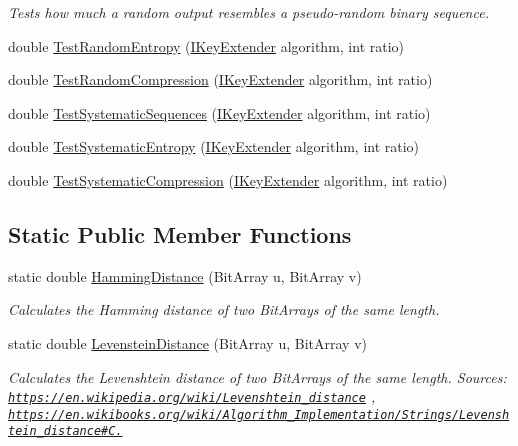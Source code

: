 \begin{DoxyCompactItemize}
\begin{DoxyCompactList}\small\item\em Tests how much a random output resembles a pseudo-\/random binary sequence. \end{DoxyCompactList}\item 
double \hyperlink{class_crypto_1_1_function_testing_a9a647990f55860fb5c1703e4734a78e3}{Test\+Random\+Entropy} (\hyperlink{interface_crypto_1_1_i_key_extender}{I\+Key\+Extender} algorithm, int ratio)
\item 
double \hyperlink{class_crypto_1_1_function_testing_a29540726fa140a1cf1d2b637af553233}{Test\+Random\+Compression} (\hyperlink{interface_crypto_1_1_i_key_extender}{I\+Key\+Extender} algorithm, int ratio)
\item 
double \hyperlink{class_crypto_1_1_function_testing_a082771a8c25d3ac4b29906cbd73fb584}{Test\+Systematic\+Sequences} (\hyperlink{interface_crypto_1_1_i_key_extender}{I\+Key\+Extender} algorithm, int ratio)
\item 
double \hyperlink{class_crypto_1_1_function_testing_a38ff139e200ca760a150fd23f9b8c754}{Test\+Systematic\+Entropy} (\hyperlink{interface_crypto_1_1_i_key_extender}{I\+Key\+Extender} algorithm, int ratio)
\item 
double \hyperlink{class_crypto_1_1_function_testing_a3e1bedf80b820d257984dbae03d0e0e1}{Test\+Systematic\+Compression} (\hyperlink{interface_crypto_1_1_i_key_extender}{I\+Key\+Extender} algorithm, int ratio)
\end{DoxyCompactItemize}
\subsection*{Static Public Member Functions}
\begin{DoxyCompactItemize}
\item 
static double \hyperlink{class_crypto_1_1_function_testing_a643a83c8528858b2cfe531c176162796}{Hamming\+Distance} (Bit\+Array u, Bit\+Array v)
\begin{DoxyCompactList}\small\item\em Calculates the Hamming distance of two Bit\+Arrays of the same length. \end{DoxyCompactList}\item 
static double \hyperlink{class_crypto_1_1_function_testing_a88a16df256e6d63d43fbbb3b5c644f29}{Levenstein\+Distance} (Bit\+Array u, Bit\+Array v)
\begin{DoxyCompactList}\small\item\em Calculates the Levenshtein distance of two Bit\+Arrays of the same length. Sources\+: \href{https://en.wikipedia.org/wiki/Levenshtein_distance}{\tt https\+://en.\+wikipedia.\+org/wiki/\+Levenshtein\+\_\+distance} , \href{https://en.wikibooks.org/wiki/Algorithm_Implementation/Strings/Levenshtein_distance#C.23}{\tt https\+://en.\+wikibooks.\+org/wiki/\+Algorithm\+\_\+\+Implementation/\+Strings/\+Levenshtein\+\_\+distance\#\+C.} \end{DoxyCompactList}\end{DoxyCompactItemize}


